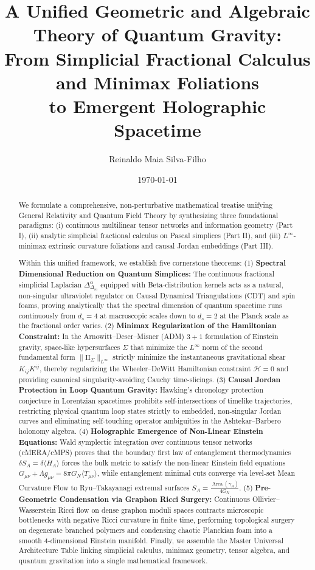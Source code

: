 \documentclass[11pt,a4paper,reqno]{amsart}
\title[A Unified Theory of Quantum Gravity]{A Unified Geometric and Algebraic Theory of Quantum Gravity:\\ From Simplicial Fractional Calculus and Minimax Foliations\\ to Emergent Holographic Spacetime}
\author{Reinaldo Maia Silva-Filho}
\date{\today}
\theoremstyle{definition}
\numberwithin{equation}{section}
\providecommand{\Area}{\operatorname{Area}}
\providecommand{\II}{\mathrm{I\!I}}
\providecommand{\II}{\mathrm{II}}
\providecommand{\Area}{\mathrm{Area}}
\begin{document}
\begin{abstract}
We formulate a comprehensive, non-perturbative mathematical treatise unifying General Relativity and Quantum Field Theory by synthesizing three foundational paradigms: (i) continuous multilinear tensor networks and information geometry (Part I), (ii) analytic simplicial fractional calculus on Pascal simplices (Part II), and (iii) $L^\infty$-minimax extrinsic curvature foliations and causal Jordan embeddings (Part III). 

Within this unified framework, we establish five cornerstone theorems:
(1) \textbf{Spectral Dimensional Reduction on Quantum Simplices:} The continuous fractional simplicial Laplacian $\Delta_{\Delta_m}^\alpha$ equipped with Beta-distribution kernels acts as a natural, non-singular ultraviolet regulator on Causal Dynamical Triangulations (CDT) and spin foams, proving analytically that the spectral dimension of quantum spacetime runs continuously from $d_s = 4$ at macroscopic scales down to $d_s = 2$ at the Planck scale as the fractional order varies.
(2) \textbf{Minimax Regularization of the Hamiltonian Constraint:} In the Arnowitt--Deser--Misner (ADM) $3+1$ formulation of Einstein gravity, space-like hypersurfaces $\Sigma$ that minimize the $L^\infty$ norm of the second fundamental form $\|\II_\Sigma\|_{L^\infty}$ strictly minimize the instantaneous gravitational shear $K_{ij}K^{ij}$, thereby regularizing the Wheeler--DeWitt Hamiltonian constraint $\mathcal{H} = 0$ and providing canonical singularity-avoiding Cauchy time-slicings.
(3) \textbf{Causal Jordan Protection in Loop Quantum Gravity:} Hawking's chronology protection conjecture in Lorentzian spacetimes prohibits self-intersections of timelike trajectories, restricting physical quantum loop states strictly to embedded, non-singular Jordan curves and eliminating self-touching operator ambiguities in the Ashtekar--Barbero holonomy algebra.
(4) \textbf{Holographic Emergence of Non-Linear Einstein Equations:} Wald symplectic integration over continuous tensor networks (cMERA/cMPS) proves that the boundary first law of entanglement thermodynamics $\delta S_A = \delta \langle H_A \rangle$ forces the bulk metric to satisfy the non-linear Einstein field equations $G_{\mu\nu} + \Lambda g_{\mu\nu} = 8\pi G_N \langle T_{\mu\nu} \rangle$, while entanglement minimal cuts converge via level-set Mean Curvature Flow to Ryu--Takayanagi extremal surfaces $S_A = \frac{\Area(\gamma_A)}{4 G_N}$.
(5) \textbf{Pre-Geometric Condensation via Graphon Ricci Surgery:} Continuous Ollivier--Wasserstein Ricci flow on dense graphon moduli spaces contracts microscopic bottlenecks with negative Ricci curvature in finite time, performing topological surgery on degenerate branched polymers and condensing chaotic Planckian foam into a smooth 4-dimensional Einstein manifold.
Finally, we assemble the Master Universal Architecture Table linking simplicial calculus, minimax geometry, tensor algebra, and quantum gravitation into a single mathematical framework.
\end{abstract}
\end{document}
